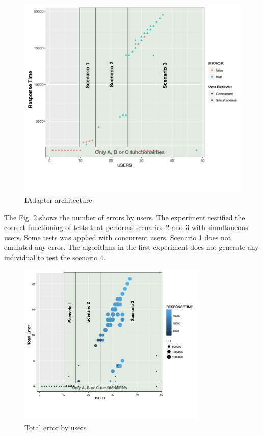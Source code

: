 \documentclass[review]{elsarticle}
\begin{document}
\begin{figure}[H]
\centering
\includegraphics[width=1\textwidth]{./images/experiment1responsetime.png}
\caption{IAdapter architecture}
\label{fig:responsetimeexperiment1}
\end{figure}

The Fig. \ref{fig:totalerrorexperiment1} shows the number of errors by users. The experiment testified the correct functioning of tests that performs  scenarios 2 and 3 with simultaneous users. Some tests was applied with concurrent users. Scenario 1 does not emulated any error. The algorithms in the first experiment does not generate any individual to test the scenario 4. 

\begin{figure}[H]
\centering
\includegraphics[width=0.8\textwidth]{./images/experiment1error.png}
\caption{Total error by users}
\label{fig:totalerrorexperiment1}
\end{figure}
\end{document}
